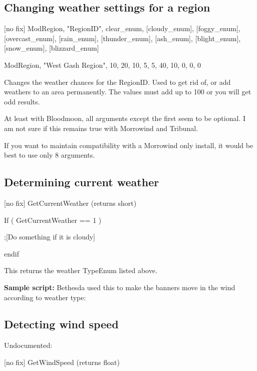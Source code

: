 \hypertarget{changing-weather-settings-for-a-region}{%
\subsection{Changing weather settings for a
region}\label{changing-weather-settings-for-a-region}}

{[}no fix{]} ModRegion, "RegionID", clear\_enum, {[}cloudy\_enum{]},
{[}foggy\_enum{]}, {[}overcast\_enum{]}, {[}rain\_enum{]},
{[}thunder\_enum{]}, {[}ash\_enum{]}, {[}blight\_enum{]},
{[}snow\_enum{]}, {[}blizzard\_enum{]}

ModRegion, "West Gash Region", 10, 20, 10, 5, 5, 40, 10, 0, 0, 0

Changes the weather chances for the RegionID. Used to get rid of, or add
weathers to an area permanently. The values must add up to 100 or you
will get odd results.

At least with Bloodmoon, all arguments except the first seem to be
optional. I am not sure if this remains true with Morrowind and
Tribunal.

If you want to maintain compatibility with a Morrowind only install, it
would be best to use only 8 arguments.

\hypertarget{determining-current-weather}{%
\subsection{Determining current
weather}\label{determining-current-weather}}

{[}no fix{]} GetCurrentWeather (returns short)

If ( GetCurrentWeather == 1 )

;{[}Do something if it is cloudy{]}

endif

This returns the weather TypeEnum listed above.

\textbf{Sample script:} Bethesda used this to make the banners move in
the wind according to weather type:



\hypertarget{detecting-wind-speed}{%
\subsection{Detecting wind speed}\label{detecting-wind-speed}}

Undocumented:

{[}no fix{]} GetWindSpeed (returns float)

